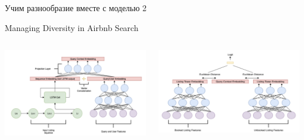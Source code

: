 \documentclass[11pt,aspectratio=169]{beamer}
\begin{document}
\begin{frame}{Учим разнообразие вместе с моделью 2}

\begin{center}
Managing Diversity in Airbnb Search \cite{AIRBNB}
\end{center}

\begin{columns}

\begin{column}{0.45\textwidth}
\begin{center}
\includegraphics[scale=0.25]{images/airbnb2.png}
\end{center}
\end{column}

\begin{column}{0.45\textwidth} 
\begin{center}
\includegraphics[scale=0.25]{images/airbnb.png}
\end{center}
\end{column}

\end{columns}

\end{frame}
\end{document}
